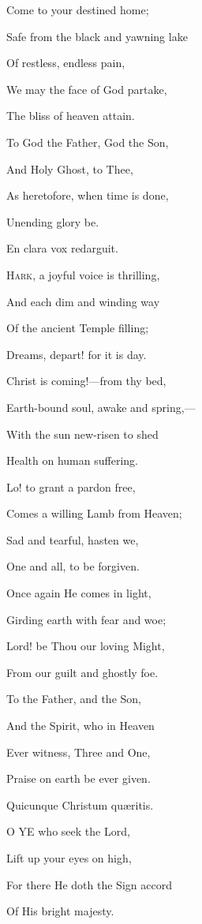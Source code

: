 Come to your destined home; 

Safe from the black and yawning lake

Of restless, endless pain,

We may the face of God partake,

The bliss of heaven attain.

To God the Father, God the Son,

And Holy Ghost, to Thee,

As heretofore, when time is done,

Unending glory be.


En clara vox redarguit.

H\textsc{ark}, a joyful voice is thrilling,

And each dim and winding way

Of the ancient Temple filling;

Dreams, depart! for it is day.

Christ is coming!—from thy bed,

Earth-bound soul, awake and spring,—

With the sun new-risen to shed

Health on human suffering.

Lo! to grant a pardon free,

Comes a willing Lamb from Heaven;

Sad and tearful, hasten we,

One and all, to be forgiven.

Once again He comes in light,

Girding earth with fear
and woe;

Lord! be Thou our loving Might,

From our guilt and ghostly
foe.

To the Father, and the Son,

And the Spirit, who in
Heaven

Ever witness, Three and One,

Praise on earth be ever
given.


Quicunque Christum quæritis.

O YE who seek the Lord,

Lift up your eyes on high,

For there He doth the Sign accord

Of His bright majesty.

